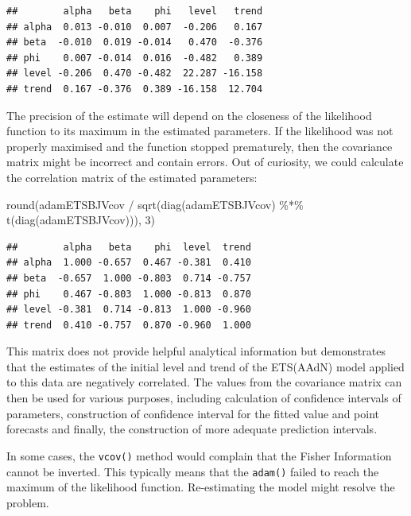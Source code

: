 \documentclass[
]{book}
\newenvironment{Shaded}{\begin{snugshade}}{\end{snugshade}}
\newcommand{\DecValTok}[1]{\textcolor[rgb]{0.00,0.00,0.81}{#1}}
\newcommand{\FunctionTok}[1]{\textcolor[rgb]{0.00,0.00,0.00}{#1}}
\newcommand{\NormalTok}[1]{#1}
\newcommand{\SpecialCharTok}[1]{\textcolor[rgb]{0.00,0.00,0.00}{#1}}
\theoremstyle{definition}
\theoremstyle{definition}
\theoremstyle{definition}
\theoremstyle{definition}
\theoremstyle{remark}
\begin{document}
\begin{verbatim}
##        alpha   beta    phi   level   trend
## alpha  0.013 -0.010  0.007  -0.206   0.167
## beta  -0.010  0.019 -0.014   0.470  -0.376
## phi    0.007 -0.014  0.016  -0.482   0.389
## level -0.206  0.470 -0.482  22.287 -16.158
## trend  0.167 -0.376  0.389 -16.158  12.704
\end{verbatim}

The precision of the estimate will depend on the closeness of the likelihood function to its maximum in the estimated parameters. If the likelihood was not properly maximised and the function stopped prematurely, then the covariance matrix might be incorrect and contain errors. Out of curiosity, we could calculate the correlation matrix of the estimated parameters:

\begin{Shaded}
\begin{Highlighting}[]
\FunctionTok{round}\NormalTok{(adamETSBJVcov }\SpecialCharTok{/}
        \FunctionTok{sqrt}\NormalTok{(}\FunctionTok{diag}\NormalTok{(adamETSBJVcov) }\SpecialCharTok{\%*\%}
               \FunctionTok{t}\NormalTok{(}\FunctionTok{diag}\NormalTok{(adamETSBJVcov))), }\DecValTok{3}\NormalTok{)}
\end{Highlighting}
\end{Shaded}

\begin{verbatim}
##        alpha   beta    phi  level  trend
## alpha  1.000 -0.657  0.467 -0.381  0.410
## beta  -0.657  1.000 -0.803  0.714 -0.757
## phi    0.467 -0.803  1.000 -0.813  0.870
## level -0.381  0.714 -0.813  1.000 -0.960
## trend  0.410 -0.757  0.870 -0.960  1.000
\end{verbatim}

This matrix does not provide helpful analytical information but demonstrates that the estimates of the initial level and trend of the ETS(AAdN) model applied to this data are negatively correlated. The values from the covariance matrix can then be used for various purposes, including calculation of confidence intervals of parameters, construction of confidence interval for the fitted value and point forecasts and finally, the construction of more adequate prediction intervals.

In some cases, the \texttt{vcov()} method would complain that the Fisher Information cannot be inverted. This typically means that the \texttt{adam()} failed to reach the maximum of the likelihood function. Re-estimating the model might resolve the problem.
\end{document}
